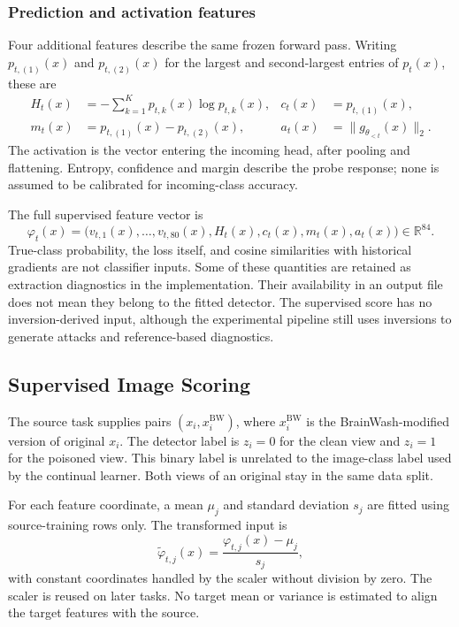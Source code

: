 \subsubsection{Prediction and activation features}

Four additional features describe the same frozen forward pass. Writing
$p_{t,(1)}(x)$ and $p_{t,(2)}(x)$ for the largest and second-largest entries
of $p_t(x)$, these are
\begin{align}
    H_t(x)&=-\sum_{k=1}^{K}p_{t,k}(x)\log p_{t,k}(x),
        &c_t(x)&=p_{t,(1)}(x), \label{eq:methods-uncertainty-a}\\
    m_t(x)&=p_{t,(1)}(x)-p_{t,(2)}(x),
        &a_t(x)&=\|g_{\theta_{<t}}(x)\|_2.
        \label{eq:methods-uncertainty-b}
\end{align}
The activation is the vector entering the incoming head, after pooling and
flattening. Entropy, confidence and margin describe the probe response;
none is assumed to be calibrated for incoming-class accuracy.

The full supervised feature vector is
\begin{equation}
    \varphi_t(x)=
    \bigl(v_{t,1}(x),\ldots,v_{t,80}(x),H_t(x),c_t(x),m_t(x),a_t(x)\bigr)
    \in\mathbb{R}^{84}.
    \label{eq:methods-full-feature}
\end{equation}
True-class probability, the loss itself, and cosine similarities with
historical gradients are not classifier inputs. Some of these quantities
are retained as extraction diagnostics in the implementation. Their
availability in an output file does not mean they belong to the fitted
detector. The supervised score has no inversion-derived input, although the
experimental pipeline still uses inversions to generate attacks and
reference-based diagnostics.

\subsection{Supervised Image Scoring}
\label{subsec:methods-supervised}

The source task supplies pairs $(x_i,x_i^{\mathrm{BW}})$, where
$x_i^{\mathrm{BW}}$ is the BrainWash-modified version of original $x_i$.
The detector label is $z_i=0$ for the clean view and $z_i=1$ for the poisoned
view. This binary label is unrelated to the image-class label used by the
continual learner. Both views of an original stay in the same data split.

For each feature coordinate, a mean $\mu_j$ and standard deviation $s_j$
are fitted using source-training rows only. The transformed input is
\begin{equation}
    \widetilde{\varphi}_{t,j}(x)
       =\frac{\varphi_{t,j}(x)-\mu_j}{s_j},
    \label{eq:methods-scaling}
\end{equation}
with constant coordinates handled by the scaler without division by zero.
The scaler is reused on later tasks. No target mean or variance is
estimated to align the target features with the source.

